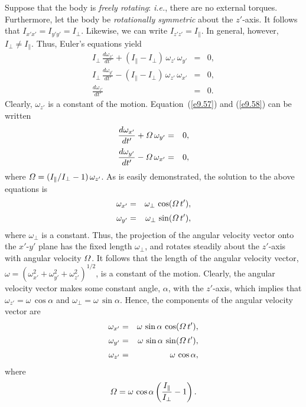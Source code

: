Suppose that the body is {\em freely rotating}: {\em i.e.}, there are no external
torques. Furthermore, let the body be {\em rotationally symmetric}\/
about the $z'$-axis. It follows that $I_{x'x'} = I_{y'y'} = I_\perp$.
Likewise, we can write $I_{z'z'} = I_\parallel$. In general, however, $I_\perp\neq I_\parallel$. Thus, Euler's equations  yield
\begin{eqnarray}\label{e9.57}
I_\perp\,\frac{d\omega_{x'}}{dt'} + (I_{\parallel}-I_{\perp})\,\omega_{z'}\,\omega_{y'} &=& 0,\\[0.5ex]
I_\perp\,\frac{d\omega_{y'}}{dt'} - (I_{\parallel}-I_{\perp})\,
\omega_{z'}\,\omega_{x'} &=& 0,\label{e9.58}\\[0.5ex]
\frac{d\omega_{z'}}{dt'} &=& 0.
\end{eqnarray}
Clearly, $\omega_{z'}$ is a constant of the motion.
Equation~(\ref{e9.57}) and (\ref{e9.58}) can be written
\begin{eqnarray}
\frac{d\omega_{x'}}{dt'} + {\mit\Omega}\,\omega_{y'} &=& 0,\\[0.5ex]
\frac{d\omega_{y'}}{dt'} - {\mit\Omega}\,\omega_{x'} &=& 0,
\end{eqnarray}
where ${\mit\Omega}= (I_{\parallel}/I_\perp-1)\,\omega_{z'}$. As is easily
demonstrated, the solution to the above equations is
\begin{eqnarray}
\omega_{x'} &=& \omega_\perp\,\cos({\mit\Omega}\,t'),\\[0.5ex]
\omega_{y'}&=&\omega_\perp\,\sin({\mit\Omega}\,t'),
\end{eqnarray}
where $\omega_\perp$ is a constant. Thus, the projection of the
angular velocity vector onto the $x'$-$y'$ plane has the fixed length
$\omega_\perp$, and rotates steadily about the $z'$-axis with angular
velocity ${\mit\Omega}$.
It follows that the length of the angular
velocity vector, $\omega=(\omega_{x'}^2+\omega_{y'}^2+\omega_{z'}^2)^{1/2}$,  is a constant of the motion.
Clearly,  the angular
velocity vector makes some constant angle, $\alpha$,  with the $z'$-axis, which implies that
$\omega_{z'} = \omega\,\cos\alpha$ and $\omega_\perp = \omega\,\sin\alpha$.
Hence, the components of the angular velocity vector are
\begin{eqnarray}
\omega_{x'} &=& \omega\,\sin\alpha\,\cos({\mit\Omega}\,t'),\\[0.5ex]
\omega_{y'} &=& \omega\,\sin\alpha\,\sin({\mit\Omega}\,t'),\\[0.5ex]
\omega_{z'} &=& \omega\,\cos\alpha,
\end{eqnarray}
where
\begin{equation}\label{e9.68a}
{\mit\Omega} =\omega\,\cos\alpha \left(\frac{I_\parallel}{I_\perp}-1\right).
\end{equation}
